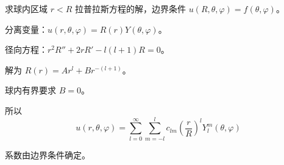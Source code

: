 \begin{lizi}{}{}
求球内区域 $r < R$ 拉普拉斯方程的解，边界条件 $u(R, \theta, \varphi) = f(\theta, \varphi)$。

\begin{jie}
    分离变量：$u(r, \theta, \varphi) = R(r)Y(\theta, \varphi)$。
    
    径向方程：$r^2R'' + 2rR' - l(l+1)R = 0$。
    
    解为 $R(r) = Ar^l + Br^{-(l+1)}$。
    
    球内有界要求 $B = 0$。
    
    所以
    \begin{equation}
        u(r, \theta, \varphi) = \sum_{l=0}^{\infty}\sum_{m=-l}^{l} c_{lm}\left(\frac{r}{R}\right)^l Y_l^m(\theta, \varphi)
    \end{equation}
    
    系数由边界条件确定。
\end{jie}
\end{lizi}


